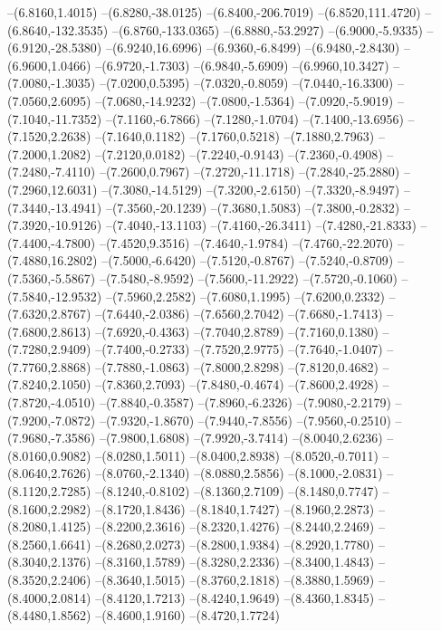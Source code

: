 {\begin{scope}
--(6.8160,1.4015)
--(6.8280,-38.0125)
--(6.8400,-206.7019)
--(6.8520,111.4720)
--(6.8640,-132.3535)
--(6.8760,-133.0365)
--(6.8880,-53.2927)
--(6.9000,-5.9335)
--(6.9120,-28.5380)
--(6.9240,16.6996)
--(6.9360,-6.8499)
--(6.9480,-2.8430)
--(6.9600,1.0466)
--(6.9720,-1.7303)
--(6.9840,-5.6909)
--(6.9960,10.3427)
--(7.0080,-1.3035)
--(7.0200,0.5395)
--(7.0320,-0.8059)
--(7.0440,-16.3300)
--(7.0560,2.6095)
--(7.0680,-14.9232)
--(7.0800,-1.5364)
--(7.0920,-5.9019)
--(7.1040,-11.7352)
--(7.1160,-6.7866)
--(7.1280,-1.0704)
--(7.1400,-13.6956)
--(7.1520,2.2638)
--(7.1640,0.1182)
--(7.1760,0.5218)
--(7.1880,2.7963)
--(7.2000,1.2082)
--(7.2120,0.0182)
--(7.2240,-0.9143)
--(7.2360,-0.4908)
--(7.2480,-7.4110)
--(7.2600,0.7967)
--(7.2720,-11.1718)
--(7.2840,-25.2880)
--(7.2960,12.6031)
--(7.3080,-14.5129)
--(7.3200,-2.6150)
--(7.3320,-8.9497)
--(7.3440,-13.4941)
--(7.3560,-20.1239)
--(7.3680,1.5083)
--(7.3800,-0.2832)
--(7.3920,-10.9126)
--(7.4040,-13.1103)
--(7.4160,-26.3411)
--(7.4280,-21.8333)
--(7.4400,-4.7800)
--(7.4520,9.3516)
--(7.4640,-1.9784)
--(7.4760,-22.2070)
--(7.4880,16.2802)
--(7.5000,-6.6420)
--(7.5120,-0.8767)
--(7.5240,-0.8709)
--(7.5360,-5.5867)
--(7.5480,-8.9592)
--(7.5600,-11.2922)
--(7.5720,-0.1060)
--(7.5840,-12.9532)
--(7.5960,2.2582)
--(7.6080,1.1995)
--(7.6200,0.2332)
--(7.6320,2.8767)
--(7.6440,-2.0386)
--(7.6560,2.7042)
--(7.6680,-1.7413)
--(7.6800,2.8613)
--(7.6920,-0.4363)
--(7.7040,2.8789)
--(7.7160,0.1380)
--(7.7280,2.9409)
--(7.7400,-0.2733)
--(7.7520,2.9775)
--(7.7640,-1.0407)
--(7.7760,2.8868)
--(7.7880,-1.0863)
--(7.8000,2.8298)
--(7.8120,0.4682)
--(7.8240,2.1050)
--(7.8360,2.7093)
--(7.8480,-0.4674)
--(7.8600,2.4928)
--(7.8720,-4.0510)
--(7.8840,-0.3587)
--(7.8960,-6.2326)
--(7.9080,-2.2179)
--(7.9200,-7.0872)
--(7.9320,-1.8670)
--(7.9440,-7.8556)
--(7.9560,-0.2510)
--(7.9680,-7.3586)
--(7.9800,1.6808)
--(7.9920,-3.7414)
--(8.0040,2.6236)
--(8.0160,0.9082)
--(8.0280,1.5011)
--(8.0400,2.8938)
--(8.0520,-0.7011)
--(8.0640,2.7626)
--(8.0760,-2.1340)
--(8.0880,2.5856)
--(8.1000,-2.0831)
--(8.1120,2.7285)
--(8.1240,-0.8102)
--(8.1360,2.7109)
--(8.1480,0.7747)
--(8.1600,2.2982)
--(8.1720,1.8436)
--(8.1840,1.7427)
--(8.1960,2.2873)
--(8.2080,1.4125)
--(8.2200,2.3616)
--(8.2320,1.4276)
--(8.2440,2.2469)
--(8.2560,1.6641)
--(8.2680,2.0273)
--(8.2800,1.9384)
--(8.2920,1.7780)
--(8.3040,2.1376)
--(8.3160,1.5789)
--(8.3280,2.2336)
--(8.3400,1.4843)
--(8.3520,2.2406)
--(8.3640,1.5015)
--(8.3760,2.1818)
--(8.3880,1.5969)
--(8.4000,2.0814)
--(8.4120,1.7213)
--(8.4240,1.9649)
--(8.4360,1.8345)
--(8.4480,1.8562)
--(8.4600,1.9160)
--(8.4720,1.7724)

\end{scope}}
